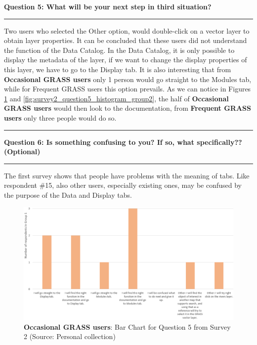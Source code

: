 \documentclass[a4paper,10pt,twoside]{article}
\begin{document}
\newpage
\noindent \textbf{Question 5:  What will be your next step in third situation?}
\par\noindent\rule{\textwidth}{0.4pt}

\noindent Two users who selected the Other option, would double-click on a vector layer to obtain layer properties. It can be concluded that these users did not understand the function of the Data Catalog. In the Data Catalog, it is only possible to display the metadata of the layer, if we want to change the display properties of this layer, we have to go to the Display tab. It is also interesting that from \textbf{Occasional GRASS users} only 1 person would go straight to the Modules tab, while for {Frequent GRASS users} this option prevails. As we can notice in Figures \ref{fig:survey2_question5_histogram_group1} and \ref{fig:survey2_question5_histogram_group2}, the half of \textbf{Occasional GRASS users} would then look to the documentation, from \textbf{Frequent GRASS users} only three people would do so.

\par\noindent\rule{\textwidth}{0.4pt}
\noindent \textbf{Question 6: Is something confusing to you? If so, what specifically?? (Optional)}
\par\noindent\rule{\textwidth}{0.4pt}

\noindent The first survey shows that people have problems with the meaning of tabs. Like respondent \#15, also other users, especially existing ones, may be confused by the purpose of the Data and Display tabs.

\vspace{0.3cm}
\begin{figure}[hbt!] 
\begin{center}
\includegraphics[width=17cm]{../surveys/analyzed_data/survey2_question5_histogram_group1.png} 
\caption[\textbf{Occasional GRASS users}: Bar Chart for Question 5 from Survey 2]{\textbf{Occasional GRASS users}: Bar Chart for Question 5 from Survey 2 (Source: Personal collection)}
\label{fig:survey2_question5_histogram_group1}
\end{center}
\end{figure}
\end{document}
